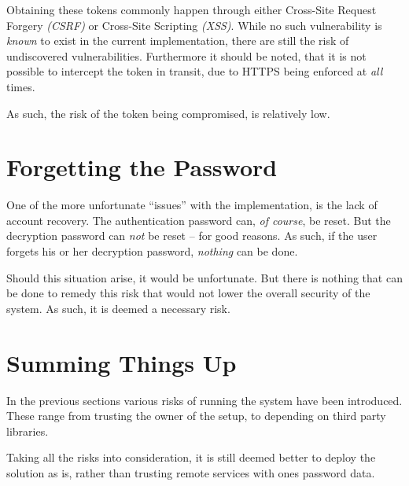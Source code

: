 		Obtaining these tokens commonly happen through either Cross-Site Request Forgery \emph{(CSRF)} or Cross-Site Scripting \emph{(XSS)}. 
		While no such vulnerability is \emph{known} to exist in the current implementation, there are still the risk of undiscovered vulnerabilities. Furthermore it should be noted, that it is not possible to intercept the token in transit, due to HTTPS being enforced at \emph{all} times.

		As such, the risk of the token being compromised, is relatively low.



	\section{Forgetting the Password}
		One of the more unfortunate ``issues'' with the implementation, is the lack of account recovery. The authentication password can, \emph{of course}, be reset. But the decryption password can \emph{not} be reset -- for good reasons. As such, if the user forgets his or her decryption password, \emph{nothing} can be done.

		Should this situation arise, it would be unfortunate. But there is nothing that can be done to remedy this risk that would not lower the overall security of the system. As such, it is deemed a necessary risk.

	\section{Summing Things Up}
		In the previous sections various risks of running the system have been introduced. These range from trusting the owner of the setup, to depending on third party libraries.

		Taking all the risks into consideration, it is still deemed better to deploy the solution as is, rather than trusting remote services with ones password data.
